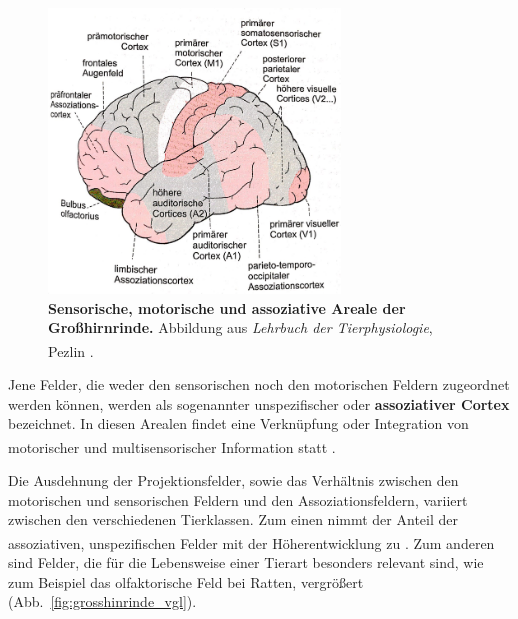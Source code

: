 \begin{figure}[H]
    \centering
    \includegraphics[width=0.69\textwidth]{pictures/Bilder_Jule/Andere/Grosshirnrinde_sensorik_motorik.png}
    \caption[Sensorische, motorische und assoziative Areale der Großhirnrinde]{\textbf{Sensorische, motorische und assoziative Areale der Großhirnrinde.} Abbildung aus \textit{Lehrbuch der Tierphysiologie}, Pezlin \textsuperscript{\cite[Kap.~14]{penzlin2005tierphys}}.}
    \label{fig:grosshirnrinde_sensorik_motorik}
\end{figure}

\noindent Jene Felder, die weder den sensorischen noch den motorischen Feldern zugeordnet werden können, werden als sogenannter unspezifischer oder \textbf{assoziativer Cortex} bezeichnet. In diesen Arealen findet eine Verknüpfung oder Integration von motorischer und multisensorischer Information statt \textsuperscript{\cite[Kap.~14]{penzlin2005tierphys}}. 

\noindent Die Ausdehnung der Projektionsfelder, sowie das Verhältnis zwischen den motorischen und sensorischen Feldern und den Assoziationsfeldern, variiert zwischen den verschiedenen Tierklassen. Zum einen nimmt der Anteil der assoziativen, unspezifischen Felder mit der Höherentwicklung zu \textsuperscript{\cite[Kap.~14]{penzlin2005tierphys}}. Zum anderen sind Felder, die für die Lebensweise einer Tierart besonders relevant sind, wie zum Beispiel das olfaktorische Feld bei Ratten, vergrößert (Abb.~\ref{fig:grosshinrinde_vgl}).


